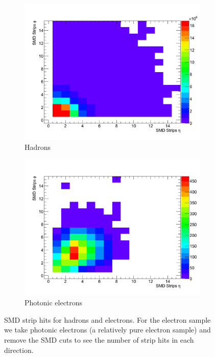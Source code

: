 \begin{figure}[htbp]
	\begin{center}
    \begin{subfigure}{0.65\textwidth}
        \includegraphics[width=\textwidth]{Plots/NPE/SMD_h_plot.pdf}
        \caption{Hadrons}
        \label{fig:SMD_h}
    \end{subfigure}
    \begin{subfigure}{0.65\textwidth}
        \includegraphics[width=\textwidth]{Plots/NPE/SMD_OS_plot.pdf}
        \caption{Photonic electrons}
        \label{fig:SMD_e}
    \end{subfigure}
	\end{center}
\caption[SMD Strip Hits]{SMD strip hits for hadrons and electrons. For the electron sample we take photonic electrons (a relatively pure electron sample) and remove the SMD cuts to see the number of strip hits in each direction.}
\label{fig:SMDstrips}
\end{figure}

